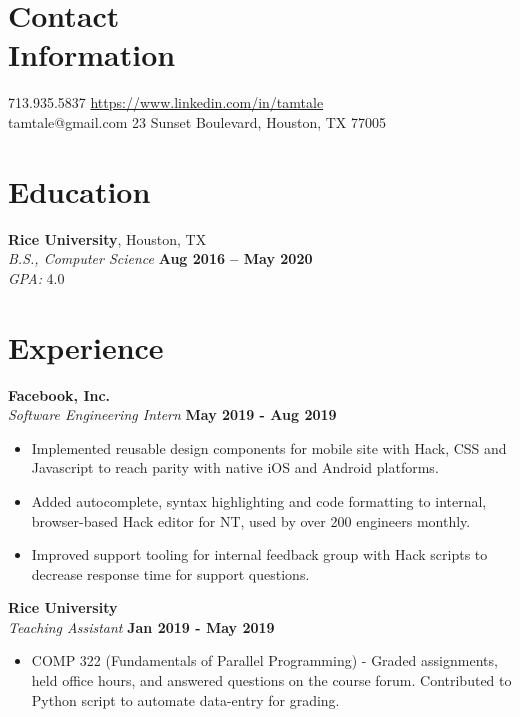 \documentclass[margin,line]{resume}
\begin{document}
\begin{resume}
    \section{\mysidestyle Contact\\Information}

    713.935.5837       \hfill \url{https://www.linkedin.com/in/tamtale
    } \\
    \noindent tamtale@gmail.com  \hfill
    23 Sunset Boulevard, Houston, TX 77005

    \section{\mysidestyle Education}

    \textbf{Rice University}, Houston, TX \vspace{1mm}\\
    \textsl{B.S., Computer Science} \hfill \textbf{Aug 2016 -- May 2020} \vspace{1mm}\\
    \textsl{GPA: } 4.0 

\section{\mysidestyle Experience}

\textbf{Facebook, Inc.} \vspace{2mm}\\\vspace{1mm}%
\textsl{Software Engineering Intern} \hfill \textbf{May 2019 - Aug 2019}
\begin{itemize}
    \item Implemented reusable design components for mobile site with Hack, CSS and Javascript to reach parity with native iOS and Android platforms.
    \item Added autocomplete, syntax highlighting and code formatting to internal, browser-based Hack editor for NT, used by over 200 engineers monthly.
    \item Improved support tooling for internal feedback group with Hack scripts to decrease response time for support questions. 
    
\end{itemize}

\textbf{Rice University} \vspace{2mm}\\\vspace{1mm}%
\textsl{Teaching Assistant} \hfill \textbf{Jan 2019 - May 2019}
\begin{itemize}
    \item COMP 322 (Fundamentals of Parallel Programming) - Graded assignments, held office hours,
     and answered questions on the course forum.
     Contributed to Python script to automate data-entry for grading.
    

\end{itemize}
\end{resume}
\end{document}
